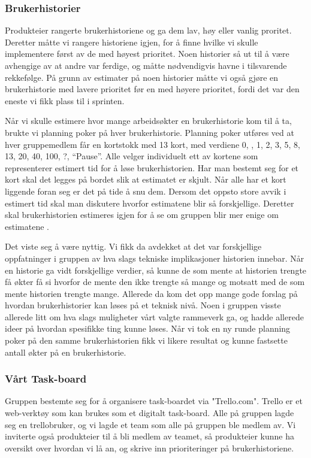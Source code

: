 \documentclass[12pt,a4paper,norsk]{article}
\begin{document}
  \subsubsection{Brukerhistorier}
  Produkteier rangerte brukerhistoriene og ga dem lav, høy eller vanlig proritet. Deretter måtte vi rangere historiene igjen, for å finne hvilke vi skulle implementere først av de med høyest prioritet. Noen historier så ut til å være avhengige av at andre var ferdige, og måtte nødvendigvis havne i tilsvarende rekkefølge. På grunn av estimater på noen historier måtte vi også gjøre en brukerhistorie med lavere prioritet før en med høyere prioritet, fordi det var den eneste vi fikk plass til i sprinten.

    Når vi skulle estimere hvor mange arbeidsøkter en brukerhistorie kom til å ta, brukte vi planning poker på hver brukerhistorie. Planning poker utføres ved at hver gruppemedlem får en kortstokk med 13 kort, med verdiene 0, , 1, 2, 3, 5, 8, 13, 20, 40, 100, ?, “Pause”. Alle velger individuelt ett av kortene som representerer estimert tid for å løse brukerhistorien. Har man bestemt seg for et kort skal det legges på bordet slik at estimatet er skjult. Når alle har et kort liggende foran seg er det på tide å snu dem. Dersom det oppsto store avvik i estimert tid skal man diskutere hvorfor estimatene blir så forskjellige. Deretter skal brukerhistorien estimeres igjen for å se om gruppen blir mer enige om estimatene \cite[side 38-40]{kniberg}.

    Det viste seg å være nyttig. Vi fikk da avdekket at det var forskjellige oppfatninger i gruppen av hva slags tekniske implikasjoner historien innebar. Når en historie ga vidt forskjellige verdier, så kunne de som mente at historien trengte få økter få si hvorfor de mente den ikke trengte så mange og motsatt med de som mente historien trengte mange. Allerede da kom det opp mange gode forslag på hvordan brukerhistorier kan løses på et teknisk nivå. Noen i gruppen visste allerede litt om hva slags muligheter vårt valgte rammeverk ga, og hadde allerede ideer på hvordan spesifikke ting kunne løses. Når vi tok en ny runde planning poker på den samme brukerhistorien fikk vi likere resultat og kunne fastsette antall økter på en brukerhistorie.

  \subsubsection{Vårt Task-board}
  Gruppen bestemte seg for å organisere task-boardet via "Trello.com". Trello er et web-verktøy som kan brukes som et digitalt task-board. Alle på gruppen lagde seg en trellobruker, og vi lagde et team som alle på gruppen ble medlem av. Vi inviterte også produkteier til å bli medlem av teamet, så produkteier kunne ha oversikt over hvordan vi lå an, og skrive inn prioriteringer på brukerhistoriene.
\end{document}
